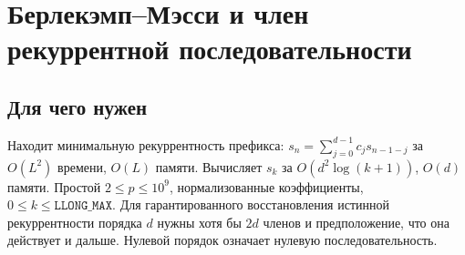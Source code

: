 \iffalse
\section{Берлекэмп--Мэсси и член рекуррентной последовательности}
\subsection*{Для чего нужен}
Находит минимальную рекуррентность префикса:
$s_n=\sum_{j=0}^{d-1}c_j s_{n-1-j}$ за $O(L^2)$ времени, $O(L)$ памяти.
Вычисляет $s_k$ за $O(d^2\log(k+1))$, $O(d)$ памяти.
Простой $2\le p\le10^9$, нормализованные коэффициенты,
$0\le k\le\texttt{LLONG\_MAX}$. Для гарантированного восстановления
истинной рекуррентности порядка $d$ нужны хотя бы $2d$ членов и предположение,
что она действует и дальше. Нулевой порядок означает нулевую последовательность.

